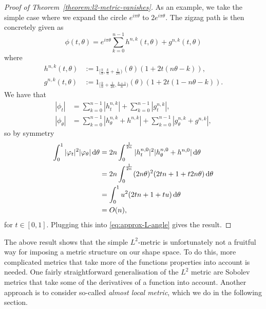 \begin{proof}[Proof of Theorem~\ref{theorem:l2-metric-vanishes}]
As an example, we take the simple case where we expand the circle $e^{i\pi\theta}$ to
$2e^{i\pi\theta}$. The zigzag path is then concretely given as
\begin{equation*}
  \phi(t,\theta) = e^{i\pi\theta}
  \sum_{k=0}^{n-1}
  h^{n,k}(t,\theta) + g^{n,k}(t,\theta)
\end{equation*}
where
\begin{equation*}
  \begin{aligned}
    h^{n,k}(t,\theta) & := 1_{[\frac{k}{n},\frac{k}{n} +
      \frac{1}{2n})}(\theta) \left( 1+2t(n\theta-k) \right), \\
    g^{n,k}(t,\theta) & := 1_{[\frac{k}{n} + \frac{1}{2n},\frac{k+1}{n})}(\theta)
    \left( 1+2t(1-n\theta-k) \right).
  \end{aligned}
\end{equation*}
We have that
\begin{equation*}
  \begin{aligned}
    |\phi_t| & = \sum_{k=0}^{n-1} |h^{n,k}_t| + \sum_{k=0}^{n-1}
    |g^{n,k}_t|, \\
    |\phi_{\theta}| & = \sum_{k=0}^{n-1} |h^{n,k}_{\theta} + h^{n,k} | +
    \sum_{k=0}^{n-1}
    |g^{n,k}_{\theta} + g^{n,k} |,
  \end{aligned}
\end{equation*}
so by symmetry
\begin{equation*}
  \begin{aligned}
    \int_{0}^{1}
    |\varphi_t|^2   |\varphi_{\theta}|
    \mathop{}\!\mathrm{d} \theta
    & =
    2n \int_{0}^{\frac{1}{2n}} |h^{n,0}_t|^2 |h^{n,0}_{\theta} + h^{n,0} |
    \mathop{}\!\mathrm{d} \theta \\
    & = 2n \int_{0}^{\frac{1}{2n}}
    (2n\theta)^2(2tn+1+t2n\theta) \mathop{}\!\mathrm{d} \theta \\
    & = \int_{0}^1
    u^2(2tn+1+t u) \mathop{}\!\mathrm{d} \theta \\
    & = O(n),
  \end{aligned}
\end{equation*}
for $t\in[0,1]$. Plugging this into \eqref{eq:approx-L-angle} gives the result.
\end{proof}

The above result shows that the simple $L^2$-metric is unfortunately not a fruitful way for imposing a metric structure on our shape space. To do this, more complicated metrics that take more of the functions properties into account is needed. One fairly straightforward generalisation of the $L^2$ metric are Sobolev metrics that take some of the derivatives of a function into account. Another approach is to consider so-called \textit{almost local metric}, which we do in the following section.


